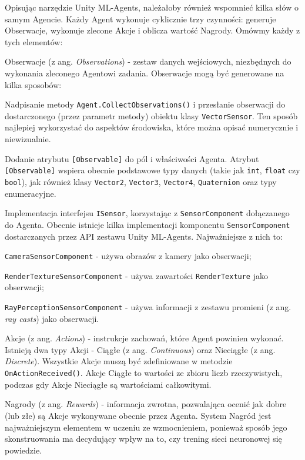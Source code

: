 Opisując narzędzie Unity ML-Agents, należałoby również wspomnieć kilka słów o samym Agencie. Każdy Agent wykonuje cyklicznie trzy czynności: generuje Obserwacje, wykonuje zlecone Akcje i oblicza wartość Nagrody. Omówmy każdy z tych elementów:
\begin{enumerate*}
\item Obserwacje (z ang. \textit{Observations}) - zestaw danych wejściowych, niezbędnych do wykonania zleconego Agentowi zadania. Obserwacje mogą być generowane na kilka sposobów:
\begin{itemize*}
\item Nadpisanie metody \texttt{Agent.CollectObservations()} i przesłanie obserwacji do dostarczonego (przez parametr metody) obiektu klasy \texttt{VectorSensor}. Ten sposób najlepiej wykorzystać do aspektów środowiska, które można opisać numerycznie i niewizualnie.
\item Dodanie atrybutu \texttt{[Observable]} do pól i właściwości Agenta. Atrybut \\ \texttt{[Observable]} wspiera obecnie podstawowe typy danych (takie jak  \texttt{int}, \texttt{float} czy \texttt{bool}), jak również klasy \texttt{Vector2}, \texttt{Vector3}, \texttt{Vector4}, \texttt{Quaternion} oraz typy enumeracyjne.
\item Implementacja interfejsu \texttt{ISensor}, korzystając z \texttt{SensorComponent} dołączanego do Agenta. Obecnie istnieje kilka implementacji komponentu \texttt{SensorComponent} dostarczanych przez API zestawu Unity ML-Agents. Najważniejsze z nich to:
\begin{itemize*}
\item \texttt{CameraSensorComponent} - używa obrazów z kamery jako obserwacji;
\item \texttt{RenderTextureSensorComponent} - używa zawartości \texttt{RenderTexture} \cite{unity:renderTexture} jako obserwacji;
\item \texttt{RayPerceptionSensorComponent} - używa informacji z zestawu promieni (z ang. \textit{ray casts}) jako obserwacji.
\end{itemize*}
\end{itemize*}
\item Akcje (z ang. \textit{Actions}) - instrukcje zachowań, które Agent powinien wykonać. Istnieją dwa typy Akcji - Ciągłe (z ang. \textit{Continuous}) oraz Nieciągłe (z ang. \textit{Discrete}). Wszystkie Akcje muszą być zdefiniowane w metodzie \texttt{OnActionReceived()}. Akcje Ciągłe to wartości ze zbioru liczb rzeczywistych, podczas gdy Akcje Nieciągłe są wartościami całkowitymi.
\item Nagrody (z ang. \textit{Rewards}) - informacja zwrotna, pozwalająca ocenić jak dobre (lub złe) są Akcje wykonywane obecnie przez Agenta. System Nagród jest najważniejszym elementem w uczeniu ze wzmocnieniem, ponieważ sposób jego skonstruowania ma decydujący wpływ na to, czy trening sieci neuronowej się powiedzie.
\end{enumerate*}

